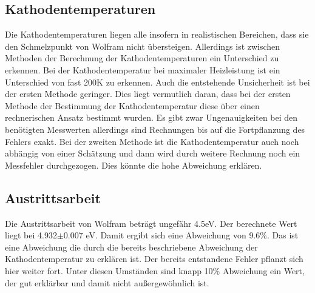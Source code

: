 \subsection{Kathodentemperaturen}

\noindent Die Kathodentemperaturen liegen alle insofern in realistischen Bereichen, dass sie den Schmelzpunkt von Wolfram nicht übersteigen. Allerdings ist zwischen Methoden der Berechnung der Kathodentemperaturen ein Unterschied zu erkennen. Bei der Kathodentemperatur bei maximaler Heizleistung ist ein Unterschied von fast 200K zu erkennen. Auch die entstehende Unsicherheit ist bei der ersten Methode geringer. Dies liegt vermutlich daran, dass bei der ersten Methode der Bestimmung der Kathodentemperatur diese über einen rechnerischen Ansatz bestimmt wurden. Es gibt zwar Ungenauigkeiten bei den benötigten Messwerten allerdings sind Rechnungen bis auf die Fortpflanzung des Fehlers exakt. Bei der zweiten Methode ist die Kathodentemperatur auch noch abhängig von einer Schätzung und dann wird durch weitere Rechnung noch ein Messfehler durchgezogen. Dies könnte die hohe Abweichung erklären.

\subsection{Austrittsarbeit}

Die Austrittsarbeit von Wolfram beträgt ungefähr 4.5eV. Der berechnete Wert liegt bei 4.932$\pm$0.007 eV. Damit ergibt sich eine Abweichung von 9.6\%. Das ist eine Abweichung die durch die bereits beschriebene Abweichung der Kathodentemperatur zu erklären ist. Der bereits entstandene Fehler pflanzt sich hier weiter fort. Unter diesen Umständen sind knapp 10\% Abweichung ein Wert, der gut erklärbar und damit nicht außergewöhnlich ist. 
